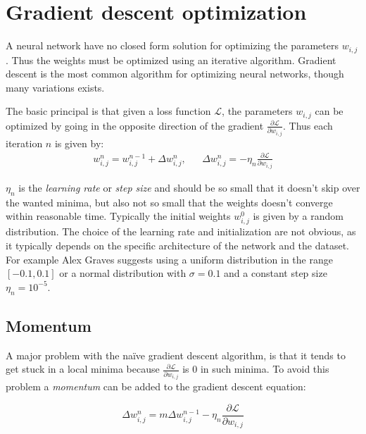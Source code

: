 \section{Gradient descent optimization}

A neural network have no closed form solution for optimizing the parameters $w_{i,j}$. Thus the weights must be optimized using an iterative algorithm. Gradient descent is the most common algorithm for optimizing neural networks, though many variations exists.

The basic principal is that given a loss function $\mathcal{L}$, the parameters $w_{i,j}$ can be optimized by going in the opposite direction of the gradient $\frac{\partial \mathcal{L}}{\partial w_{i,j}}$. Thus each iteration $n$ is given by:
\begin{equation}
\begin{aligned}
w_{i,j}^n = w_{i,j}^{n-1} + \Delta w_{i,j}^n, && \Delta w_{i,j}^n = - \eta_n \frac{\partial \mathcal{L}}{\partial w_{i,j}}
\end{aligned}
\end{equation}

$\eta_n$ is the \textit{learning rate} or \textit{step size} and should be so small that it doesn't skip over the wanted minima, but also not so small that the weights doesn't converge within reasonable time. Typically the initial weights $w^0_{i,j}$ is given by a random distribution. The choice of the learning rate and initialization are not obvious, as it typically depends on the specific architecture of the network and the dataset. For example Alex Graves \cite{alexgraves} suggests using a uniform distribution in the range $[-0.1, 0.1]$ or a normal distribution with $\sigma = 0.1$ and a constant step size $\eta_n = 10^{-5}$.

\subsection{Momentum}

A major problem with the naïve gradient descent algorithm, is that it tends to get stuck in a local minima because $\frac{\partial \mathcal{L}}{\partial w_{i,j}}$ is $0$ in such minima. To avoid this problem a \textit{momentum} can be added to the gradient descent equation:

\begin{equation}
\Delta w_{i,j}^n = m \Delta w_{i,j}^{n-1} - \eta_n \frac{\partial \mathcal{L}}{\partial w_{i,j}}
\end{equation}

